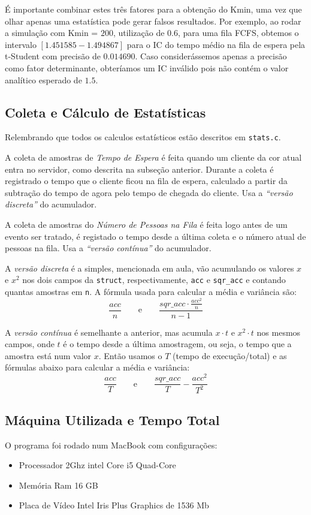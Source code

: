 \documentclass[a4paper]{article}
\newcommand{\arq}{\texttt}
\newcommand{\inlcode}{\texttt}
\begin{document}
É importante combinar estes três fatores para a obtenção do Kmin, uma vez que
olhar apenas uma estatística pode gerar falsos resultados. Por exemplo, ao rodar
a simulação com Kmin = \(200\), utilização de \(0.6\), para uma fila FCFS,
obtemos o intervalo \([1.451585 - 1.494867]\) para o IC do tempo médio
na fila de espera pela t-Student com precisão de \(0.014690\). Caso considerássemos
apenas a precisão como fator determinante, obteríamos um IC inválido
pois não contém o valor analítico esperado de \(1.5\).

\subsection{Coleta e Cálculo de Estatísticas}
Relembrando que todos os calculos estatísticos estão
descritos em \arq{stats.c}.

A coleta de amostras de \emph{Tempo de Espera} é feita
quando um cliente da cor atual entra no servidor,
como descrita na subseção anterior.
Durante a coleta é registrado o tempo
que o cliente ficou na fila de espera,
calculado a partir da subtração do tempo de agora
pelo tempo de chegada do cliente.
Usa a \emph{``versão discreta''} do acumulador.

A coleta de amostras do \emph{Número de Pessoas na Fila} é feita
logo antes de um evento ser tratado,
é registado o tempo desde a última coleta e o número atual
de pessoas na fila.
Usa a \emph{``versão contínua''} do acumulador.

A \emph{versão discreta} é a simples, mencionada em aula,
vão acumulando os valores \(x\) e \(x^2\) nos dois campos
da \inlcode{struct}, respectivamente, \inlcode{acc} e
\inlcode{sqr\_acc} e contando quantas amostras em \inlcode{n}.
A fórmula usada para calcular a média e variância são:
\[
    \frac{acc}{n}
    \qquad\text{e}\qquad
    \frac{sqr\_acc \cdot \frac{acc^2}{n}}{n - 1}
\]

A \emph{versão contínua} é semelhante a anterior,
mas acumula \(x \cdot t\) e \(x^2 \cdot t\) nos mesmos campos,
onde \(t\) é
o tempo desde a última amostragem, ou seja,
o tempo que a amostra está num valor \(x\).
Então usamos o \(T\) (tempo de execução/total)
e as fórmulas abaixo para calcular a média e variância:
\[
    \frac{acc}{T}
    \qquad\text{e}\qquad
    \frac{sqr\_acc}{T} - \frac{acc^2}{T^2}
\]

\subsection{Máquina Utilizada e Tempo Total}
O programa foi rodado num MacBook com configurações:
\begin{itemize}
    \item Processador 2Ghz intel Core i5 Quad-Core
    \item Memória Ram 16 GB
    \item Placa de Vídeo Intel Iris Plus Graphics de 1536 Mb
\end{itemize}
\end{document}
